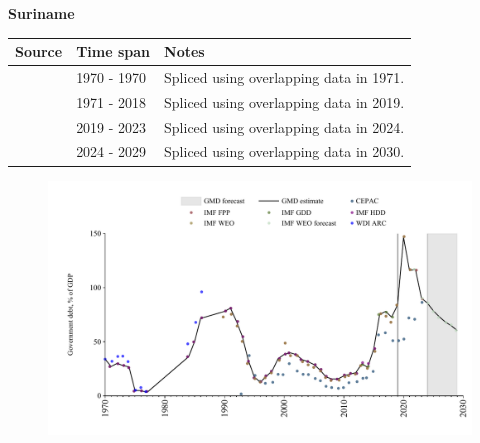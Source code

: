 \documentclass[12pt,a4paper,landscape]{article}
\begin{document}
\begin{adjustbox}{max totalsize={\paperwidth}{\paperheight},center}
\begin{minipage}[t][\textheight][t]{\textwidth}
\vspace*{0.5cm}
{}
\begin{center}
{\Large\bfseries Suriname}
\end{center}
\vspace{0.5cm}
\begin{table}[H]
\centering
\small
\begin{tabular}{|l|l|l|}
\hline
\textbf{Source} & \textbf{Time span} & \textbf{Notes} \\
\hline
\rowcolor{white}\cite{WDI_ARC}& 1970 - 1970 &Spliced using overlapping data in 1971.\\
\rowcolor{lightgray}\cite{IMF_GDD}& 1971 - 2018 &Spliced using overlapping data in 2019.\\
\rowcolor{white}\cite{IMF_FPP}& 2019 - 2023 &Spliced using overlapping data in 2024.\\
\rowcolor{lightgray}\cite{IMF_WEO_forecast}& 2024 - 2029 &Spliced using overlapping data in 2030.\\
\hline
\end{tabular}
\end{table}
\begin{figure}[H]
\centering
\includegraphics[width=\textwidth,height=0.6\textheight,keepaspectratio]{graphs/SUR_govdebt_GDP.pdf}
\end{figure}
\end{minipage}
\end{adjustbox}
\end{document}
